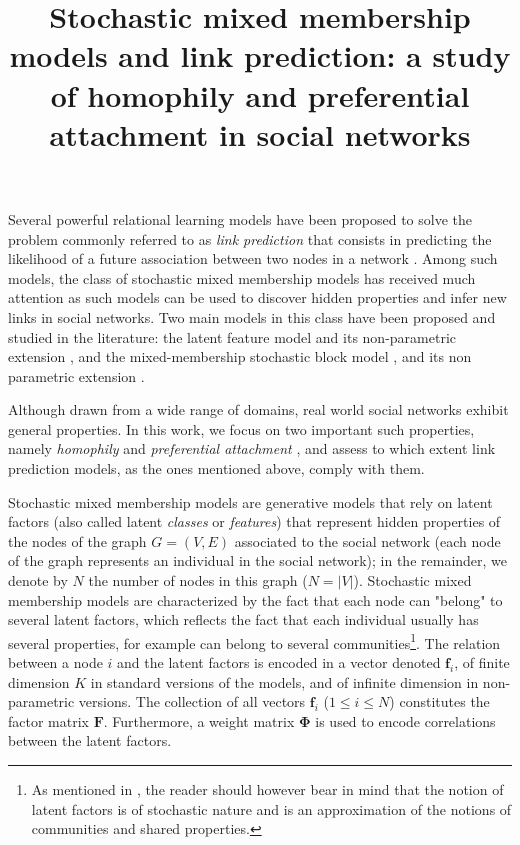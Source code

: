 \documentclass{llncs}
\title{ Stochastic mixed membership models and link prediction: a study of homophily and preferential attachment in social networks}
\newcommand{\mat}[1]{\mathbf{#1}}
\begin{document}
\maketitle

\label{sec:intro}

Several powerful relational learning models have been proposed to solve the problem commonly referred to as \textit{link prediction} that consists in predicting the likelihood of a future association between two nodes in a network \cite{Liben-Nowell07, HassanZaki11}. Among such models, the class of stochastic mixed membership models has received much attention as such models can be used to discover hidden properties and infer new links in social networks. Two main models in this class have been proposed and studied in the literature: the latent feature model \cite{BMF} and its non-parametric extension \cite{ILFRM}, and the mixed-membership stochastic block model \cite{MMSB}, and its non parametric extension \cite{iMMSB,diMMSB}.

Although drawn from a wide range of domains, real world social networks exhibit general properties. In this work, we focus on two important such properties, namely \textit{homophily} and \textit{preferential attachment} \cite{Newman2010, Barabasi2003}, and assess to which extent link prediction models, as the ones mentioned above, comply with them.

Stochastic mixed membership models are generative models that rely on latent factors (also called latent \textit{classes} or \textit{features}) that represent hidden properties of the nodes of the graph $G=(V,E)$ associated to the social network (each node of the graph represents an individual in the social network); in the remainder, we denote by $N$ the number of nodes in this graph ($N=|V|$). Stochastic mixed membership models are characterized by the fact that each node can "belong" to several latent factors, which reflects the fact that each individual usually has several properties, for example can belong to several communities\footnote{As mentioned in \cite{goldenberg2010survey}, the reader should however bear in mind that the notion of latent factors is of stochastic nature and is an approximation of the notions of communities and shared properties.}. The relation between a node $i$ and the latent factors is encoded in a vector denoted $\mat{f}_{i}$, of finite dimension $K$ in standard versions of the models, and of infinite dimension in  non-parametric versions. The collection of all vectors $\mat{f}_{i}$ ($1 \le i \le N$) constitutes the factor matrix $\mat{F}$. Furthermore, a weight matrix $\mat{\Phi}$ is used to encode correlations between the latent factors.
\end{document}
